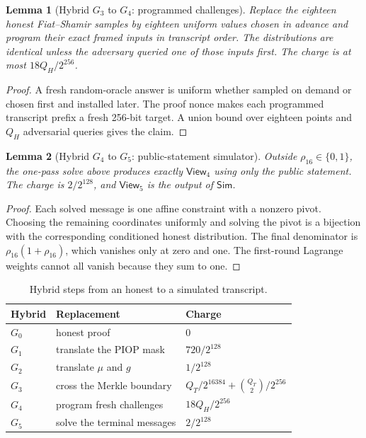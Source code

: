 \documentclass[11pt]{article}
\newtheorem{lemma}{Lemma}
\theoremstyle{definition}
\begin{document}
\begin{lemma}[Hybrid $G_3$ to $G_4$: programmed challenges]
Replace the eighteen honest Fiat--Shamir samples by eighteen uniform values
chosen in advance and program their exact framed inputs in transcript order.
The distributions are identical unless the adversary queried one of those
inputs first.  The charge is at most $18Q_H/2^{256}$.
\end{lemma}

\begin{proof}
A fresh random-oracle answer is uniform whether sampled on demand or chosen
first and installed later.  The proof nonce makes each programmed transcript
prefix a fresh 256-bit target.  A union bound over eighteen points and $Q_H$
adversarial queries gives the claim.
\end{proof}

\begin{lemma}[Hybrid $G_4$ to $G_5$: public-statement simulator]
Outside $\rho_{16}\in\{0,1\}$, the one-pass solve above produces exactly
$\mathsf{View}_4$ using only the public statement.  The charge is
$2/2^{128}$, and $\mathsf{View}_5$ is the output of $\mathsf{Sim}$.
\end{lemma}

\begin{proof}
Each solved message is one affine constraint with a nonzero pivot.  Choosing
the remaining coordinates uniformly and solving the pivot is a bijection with
the corresponding conditioned honest distribution.  The final denominator is
$\rho_{16}(1+\rho_{16})$, which vanishes only at zero and one.  The first-round
Lagrange weights cannot all vanish because they sum to one.
\end{proof}

\begin{table}[ht]
\centering\small
\caption{Hybrid steps from an honest to a simulated transcript.}
\label{tab:games}
\begin{tabular}{@{}lll@{}}
\toprule
Hybrid & Replacement & Charge \\
\midrule
$G_0$ & honest proof & $0$ \\
$G_1$ & translate the PIOP mask & $720/2^{128}$ \\
$G_2$ & translate $\mu$ and $g$ & $1/2^{128}$ \\
$G_3$ & cross the Merkle boundary & $Q_T/2^{16384}+\binom{Q_T}{2}/2^{256}$ \\
$G_4$ & program fresh challenges & $18Q_H/2^{256}$ \\
$G_5$ & solve the terminal messages & $2/2^{128}$ \\
\bottomrule
\end{tabular}
\end{table}
\end{document}
